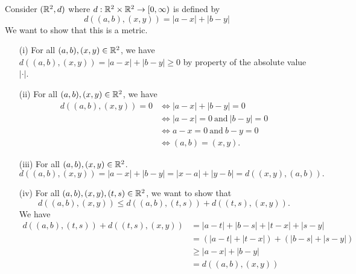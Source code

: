 \documentclass[a4paper]{report}
\begin{document}
\begin{eg}
    Consider \( (\mathbb{R}^{2}, d) \) where \( d: \mathbb{R}^{2} \times \mathbb{R}^{2} \to [0,\infty)  \) is defined by
    \[  d((a,b), (x,y)) = | a - x  |  + | b - y |   \]
    We want to show that this is a metric. 
    \begin{enumerate}
        \item[(i)] For all \( (a,b), (x,y) \in \mathbb{R}^{2} \), we have \( d((a,b),(x,y)) = | a - x  |  + |  b - y |  \geq 0  \) by property of the absolute value \( | \cdot |  \).
        \item[(ii)] For all \( (a,b), (x,y) \in \mathbb{R}^{2} \), we have 
            \begin{align*}
            d((a,b), (x,y)) = 0 &\iff | a - x  | + | b - y | = 0   \\
                                &\iff |  a - x  |  = 0 \  \text{and} \ | b - y |  = 0 \\
                                &\iff a - x = 0 \   \text{and} \  b - y = 0  \\
                                &\iff (a,b) = (x,y).
        \end{align*}
    \item[(iii)] For all \( (a,b), (x,y) \in \mathbb{R}^{2} \). 
        \[ d((a,b), (x,y)) = | a - x   | + |  b - y |  = |  x - a  |  + |  y - b  | = d((x,y), (a,b)).  \]
    \item[(iv)] For all \( (a,b), (x,y), (t,s) \in \mathbb{R}^{2}  \), we want to show that 
        \[  d((a,b), (x,y)) \leq d((a,b), (t,s)) + d((t,s), (x,y)). \]
        We have 
        \begin{align*}
            d((a,b),(t,s)) + d((t,s), (x,y)) &= | a - t |  + | b - s |  + | t - x  |  + | s -y  |  \\
                                             &= (| a - t |  + | t - x  | ) + (| b - s |  + |  s  -y  | ) \\
                                             &\geq | a - x  |  + | b - y | \\
                                             &= d((a,b), (x,y))
        \end{align*}
    \end{enumerate}
\end{eg}
\end{document}
